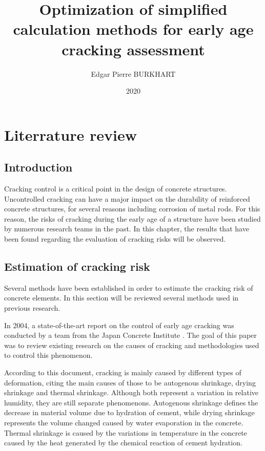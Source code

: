 \documentclass{report}
\title{Optimization of simplified calculation methods for early age cracking assessment}
\author{Edgar Pierre BURKHART}
\date{2020}
\begin{document}
\maketitle

\tableofcontents


\chapter{Literrature review}

\section{Introduction}

Cracking control is a critical point in the design of concrete structures.
Uncontrolled cracking can have a major impact on the durability of reinforced
concrete structures, for several reasons including corrosion of metal rods.
For this reason, the risks of cracking during the early age of a structure have
been studied by numerous research teams in the past. In this chapter, the
results that have been found regarding the evaluation of cracking risks will be
observed.

\section{Estimation of cracking risk}
Several methods have been established in order to estimate the cracking risk of
concrete elements. In this section will be reviewed several methods used in
previous research.

In 2004, a state-of-the-art report on the control of early age cracking was
conducted by a team from the Japan Concrete Institute \cite{soa}. The goal of
this paper was to review existing research on the causes of cracking and
methodologies used to control this phenomenon.

According to this document, cracking is mainly caused by different types of
deformation, citing the main causes of those to be autogenous shrinkage, drying
shrinkage and thermal shrinkage. Although both represent a variation in
relative humidity, they are still separate phenomenons.
Autogenous shrinkage defines the decrease in
material volume due to hydration of cement, while drying shrinkage represents
the volume changed caused by water evaporation in the concrete.
Thermal shrinkage is caused by the variations in temperature in the concrete
caused by the heat generated by the chemical reaction of cement hydration.
\end{document}

